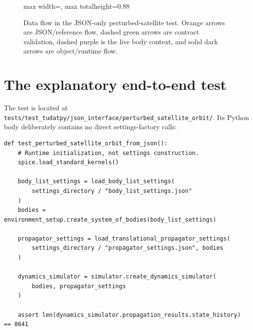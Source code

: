 \documentclass[10pt,a4paper]{article}
\newcommand{\code}[1]{\texttt{#1}}
\begin{document}
\begin{figure}[p]
\begin{adjustbox}{max width=\textwidth, max totalheight=0.88\textheight}
\end{adjustbox}
\caption{Data flow in the JSON-only perturbed-satellite test. Orange arrows are
JSON/reference flow, dashed green arrows are contract validation, dashed purple
is the live body context, and solid dark arrows are object/runtime flow.}
\end{figure}

\clearpage
\section{The explanatory end-to-end test}

The test is located at
\code{tests/test\_tudatpy/json\_interface/perturbed\_satellite\_orbit/}.
Its Python body deliberately contains no direct settings-factory calls:

\begin{lstlisting}[style=pythonstyle]
def test_perturbed_satellite_orbit_from_json():
    # Runtime initialization, not settings construction.
    spice.load_standard_kernels()

    body_list_settings = load_body_list_settings(
        settings_directory / "body_list_settings.json"
    )
    bodies = environment_setup.create_system_of_bodies(body_list_settings)

    propagator_settings = load_translational_propagator_settings(
        settings_directory / "propagator_settings.json", bodies
    )

    dynamics_simulator = simulator.create_dynamics_simulator(
        bodies, propagator_settings
    )

    assert len(dynamics_simulator.propagation_results.state_history) == 8641
\end{lstlisting}
\end{document}
